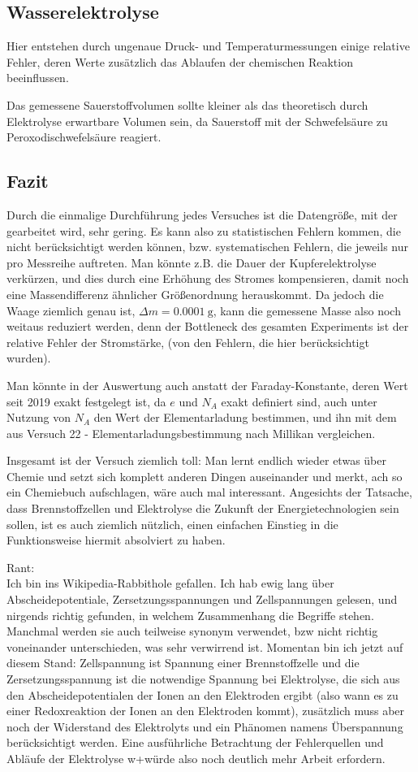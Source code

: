 \subsection{Wasserelektrolyse}
Hier entstehen durch ungenaue Druck- und Temperaturmessungen einige relative Fehler, deren Werte zusätzlich das Ablaufen der chemischen Reaktion beeinflussen.

Das gemessene Sauerstoffvolumen sollte kleiner als das theoretisch durch Elektrolyse erwartbare Volumen sein, da Sauerstoff mit der Schwefelsäure zu Peroxodischwefelsäure reagiert.   

\subsection{Fazit}
Durch die einmalige Durchführung jedes Versuches ist die Datengröße, mit der gearbeitet wird, sehr gering. Es kann also zu statistischen Fehlern kommen, die nicht berücksichtigt werden können, bzw. systematischen Fehlern, die jeweils nur pro Messreihe auftreten. Man könnte z.B. die Dauer der Kupferelektrolyse verkürzen, und dies durch eine Erhöhung des Stromes kompensieren, damit noch eine Massendifferenz ähnlicher Größenordnung herauskommt. Da jedoch die Waage ziemlich genau ist, \(\Delta m=\qty{0.0001}{\gram}\), kann die gemessene Masse also noch weitaus reduziert werden, denn der Bottleneck des gesamten Experiments ist der relative Fehler der Stromstärke, (von den Fehlern, die hier berücksichtigt wurden).

Man könnte in der Auswertung auch anstatt der Faraday-Konstante, deren Wert seit 2019 exakt festgelegt ist, da \(e\) und \(N_A\) exakt definiert sind, auch unter Nutzung von \(N_A\) den Wert der Elementarladung bestimmen, und ihn mit dem aus Versuch 22  - Elementarladungsbestimmung nach Millikan vergleichen. 

Insgesamt ist der Versuch ziemlich toll: Man lernt endlich wieder etwas über Chemie und setzt sich komplett anderen Dingen auseinander und merkt, ach so ein Chemiebuch aufschlagen, wäre auch mal interessant. Angesichts der Tatsache, dass Brennstoffzellen und Elektrolyse die Zukunft der Energietechnologien sein sollen, ist es auch ziemlich nützlich, einen einfachen Einstieg in die Funktionsweise hiermit absolviert zu haben.

Rant:\\
Ich bin ins Wikipedia-Rabbithole gefallen. Ich hab ewig lang über Abscheidepotentiale, Zersetzungsspannungen und Zellspannungen gelesen, und nirgends richtig gefunden, in welchem Zusammenhang die Begriffe stehen. Manchmal werden sie auch teilweise synonym verwendet, bzw nicht richtig voneinander unterschieden, was sehr verwirrend ist. Momentan bin ich jetzt auf diesem Stand: Zellspannung ist Spannung einer Brennstoffzelle und die Zersetzungsspannung ist die notwendige Spannung bei Elektrolyse, die sich aus den Abscheidepotentialen der Ionen an den Elektroden ergibt (also wann es zu einer Redoxreaktion der Ionen an den Elektroden kommt), zusätzlich muss aber noch der Widerstand des Elektrolyts und ein Phänomen namens Überspannung berücksichtigt werden. Eine ausführliche Betrachtung der Fehlerquellen und Abläufe der Elektrolyse w+würde also noch deutlich mehr Arbeit erfordern.

